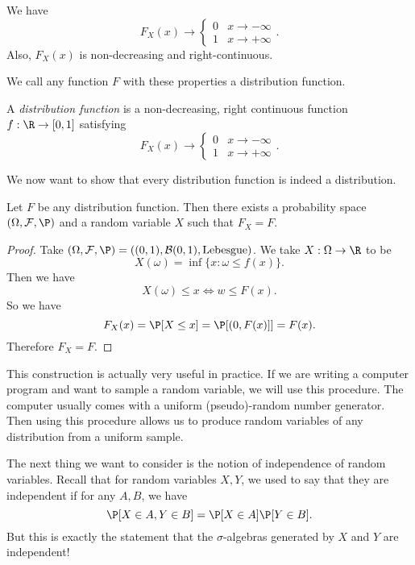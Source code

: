 \documentclass[a4paper]{article}
\begin{document}
\begin{prop}
  We have
  \[
    F_X(x) \to
    \begin{cases}
      0 & x \to -\infty\\
      1 & x \to +\infty
    \end{cases}.
  \]
  Also, $F_X(x)$ is non-decreasing and right-continuous.
\end{prop}

We call any function $F$ with these properties a distribution function.
\begin{defi}
  A \emph{distribution function} is a non-decreasing, right continuous function $f: \R \to [0, 1]$ satisfying
  \[
    F_X(x) \to
    \begin{cases}
      0 & x \to -\infty\\
      1 & x \to +\infty
    \end{cases}.
  \]
\end{defi}
We now want to show that every distribution function is indeed a distribution.

\begin{prop}
  Let $F$ be any distribution function. Then there exists a probability space $(\Omega, \mathcal{F}, \P)$ and a random variable $X$ such that $F_X = F$.
\end{prop}

\begin{proof}
  Take $(\Omega, \mathcal{F}, \P) = ((0, 1), \mathcal{B}(0, 1), \text{Lebesgue})$. We take $X: \Omega \to \R$ to be
  \[
    X(\omega) = \inf\{x: \omega \leq f(x)\}.
  \]
  Then we have
  \[
    X(\omega) \leq x \Longleftrightarrow w \leq F(x).
  \]
  So we have
  \[
    F_X(x) = \P[X \leq x] = \P[(0, F(x)]] = F(x).
  \]
  Therefore $F_X = F$.
\end{proof}

This construction is actually very useful in practice. If we are writing a computer program and want to sample a random variable, we will use this procedure. The computer usually comes with a uniform (pseudo)-random number generator. Then using this procedure allows us to produce random variables of any distribution from a uniform sample.

The next thing we want to consider is the notion of independence of random variables. Recall that for random variables $X, Y$, we used to say that they are independent if for any $A, B$, we have
\[
  \P[X \in A, Y \in B] = \P[X \in A]\P[Y \in B].
\]
But this is exactly the statement that the $\sigma$-algebras generated by $X$ and $Y$ are independent!
\end{document}
